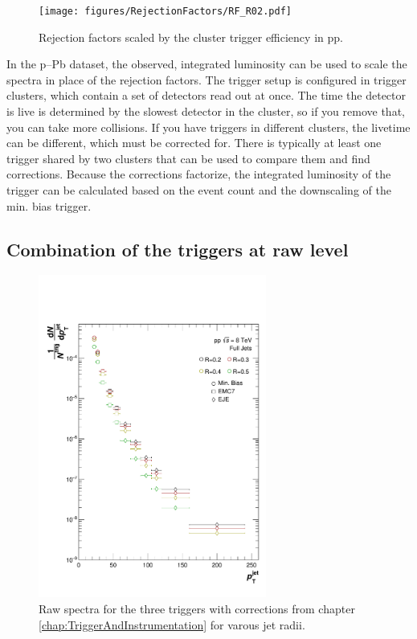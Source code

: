 \documentclass[ALICE]{ALICE_analysis_notes}
\newcommand{\pPb}{{\mbox{p--Pb}}\xspace}
\newcommand{\pp}{pp\xspace}
\begin{document}
\begin{figure}
    \centering
    \texttt{[image: figures/RejectionFactors/RF\_R02.pdf]}
    \caption{Rejection factors scaled by the cluster trigger efficiency in \pp.}
    \label{fig:RejectionFactors}
\end{figure}

In the \pPb dataset, the observed, integrated luminosity can be used to scale the spectra in place of the rejection factors. The trigger setup is configured in trigger clusters, which contain a set of detectors read out at once. The time the detector is live is determined by the slowest detector in the cluster, so if you remove that, you can take more collisions. If you have triggers in different clusters, the livetime can be different, which must be corrected for. There is typically at least one trigger shared by two clusters that can be used to compare them and find corrections. Because the corrections factorize, the integrated luminosity of the trigger can be calculated based on the event count and the downscaling of the min. bias trigger.

\subsection{Combination of the triggers at raw level}
\label{sec:triggerCombination}

\begin{figure}
    \centering
    \includegraphics[width=7.5cm]{figures/CorrRawSpec/corrRawSpec.pdf}
    \caption{Raw spectra for the three triggers with corrections from chapter \ref{chap:TriggerAndInstrumentation} for varous jet radii.}
    \label{fig:CorrRawSpec}
\end{figure}
\end{document}

